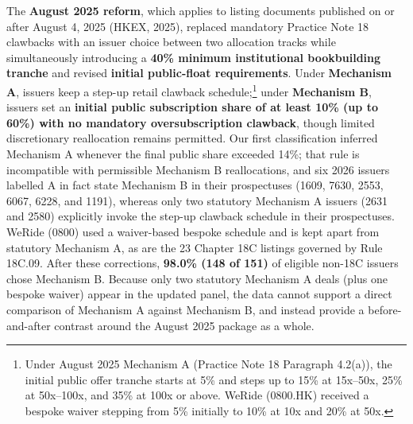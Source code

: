 \documentclass[11pt,letterpaper]{article}
\begin{document}
The \textbf{August 2025 reform}, which applies to listing documents published on or after August 4, 2025 (HKEX, 2025), replaced mandatory Practice Note 18 clawbacks with an issuer choice between two allocation tracks while simultaneously introducing a \textbf{40\% minimum institutional bookbuilding tranche} and revised \textbf{initial public-float requirements}. Under \textbf{Mechanism A}, issuers keep a step-up retail clawback schedule;\footnote{Under August 2025 Mechanism A (Practice Note 18 Paragraph 4.2(a)), the initial public offer tranche starts at 5\% and steps up to 15\% at 15x–50x, 25\% at 50x–100x, and 35\% at 100x or above. WeRide (0800.HK) received a bespoke waiver stepping from 5\% initially to 10\% at 10x and 20\% at 50x.} under \textbf{Mechanism B}, issuers set an \textbf{initial public subscription share of at least 10\% (up to 60\%) with no mandatory oversubscription clawback}, though limited discretionary reallocation remains permitted. Our first classification inferred Mechanism A whenever the final public share exceeded 14\%; that rule is incompatible with permissible Mechanism B reallocations, and six 2026 issuers labelled A in fact state Mechanism B in their prospectuses (1609, 7630, 2553, 6067, 6228, and 1191), whereas only two statutory Mechanism A issuers (2631 and 2580) explicitly invoke the step-up clawback schedule in their prospectuses. WeRide (0800) used a waiver-based bespoke schedule and is kept apart from statutory Mechanism A, as are the 23 Chapter 18C listings governed by Rule 18C.09. After these corrections, \textbf{98.0\% (148 of 151)} of eligible non-18C issuers chose Mechanism B. Because only two statutory Mechanism A deals (plus one bespoke waiver) appear in the updated panel, the data cannot support a direct comparison of Mechanism A against Mechanism B, and instead provide a before-and-after contrast around the August 2025 package as a whole.
\end{document}
